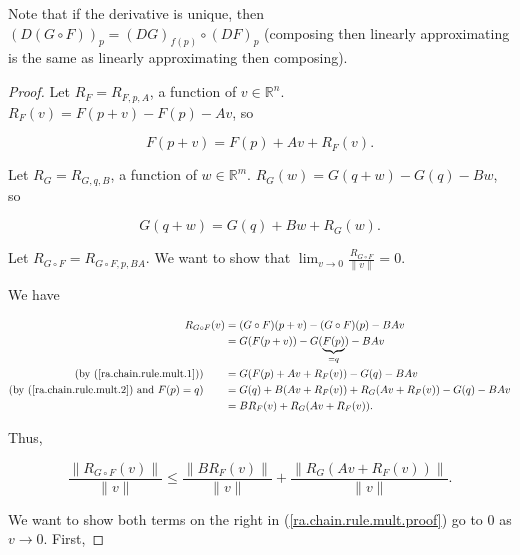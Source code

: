Note that if the derivative is unique, then \((D(G \circ F))_p = (DG)_{f(p)} \circ (DF)_p\) (composing then linearly approximating is the same as linearly approximating then composing). 

\begin{proof}

Let \(R_F = R_{F, p,A}\), a function of \(v  \in \mathbb{R}^n\). \(R_F(v) = F(p + v) - F(p) - Av\), so 

\begin{equation}\label{ra.chain.rule.mult.1}
F(p + v) = F(p) + Av + R_F(v).
\end{equation}

 Let \(R_G = R_{G, q, B}\), a function of \(w \in \mathbb{R}^m\). \(R_G(w) = G(q + w) - G(q) - Bw\), so 
 
 \begin{equation}\label{ra.chain.rule.mult.2}
 G(q + w) = G(q) + Bw + R_G(w).
 \end{equation}
 
Let \(R_{G \circ F} = R_{G \circ F, p, BA}\). We want to show that \(\lim_{v \to 0} \frac{R_{G \circ F}}{\lVert v \rVert} = 0\).

We have

\begin{align*}
R_{G \circ F} (v) & = (G \circ F)(p + v) - (G \circ F)(p) - BAv
\\ & = G(F(p+v)) - G(\underbrace{F(p)}_{=q}) - BAv
\\ \text{(by (\ref{ra.chain.rule.mult.1}))} \qquad & = G(F(p) + Av + R_F(v)) - G(q) - BAv
\\  \text{(by (\ref{ra.chain.rule.mult.2}) and \(F(p) = q\))} \qquad  & = G(q) + B(Av + R_F(v)) + R_G(Av + R_F(v)) - G(q) - BAv
\\ & = BR_F(v) + R_G(Av + R_F(v)).
\end{align*}


Thus,

\begin{equation}\label{ra.chain.rule.mult.proof}
\frac{ \lVert R_{G \circ F}(v) \rVert}{\lVert v \rVert}  \leq \frac{\lVert B R_F(v) \rVert}{\lVert v \rVert} + \frac{ \lVert R_G(Av + R_F(v)) \rVert}{\lVert v \rVert}.
\end{equation}

We want to show both terms on the right in (\ref{ra.chain.rule.mult.proof}) go to 0 as \(v \to 0\). First,


\end{proof}
